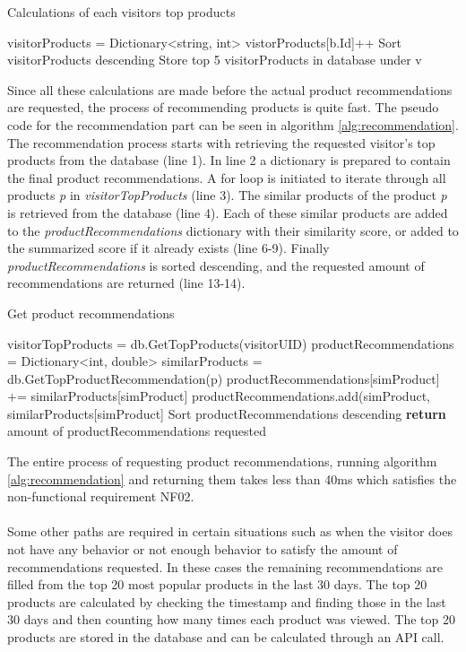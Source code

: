 \begin{algorithm}[H]
\caption{Calculations of each visitors top products}
\label{alg:topProducts}
\begin{algorithmic}[1]
\State visitorProducts = Dictionary<string, int>
\State vistorProducts[b.Id]++
\EndFor
\State Sort visitorProducts descending
\State Store top 5 visitorProducts in database under v
\EndFor
\end{algorithmic}
\end{algorithm}

Since all these calculations are made before the actual product recommendations are requested, the process of recommending products is quite fast. The pseudo code for the recommendation part can be seen in algorithm \ref{alg:recommendation}. The recommendation process starts with retrieving the requested visitor's top products from the database (line 1). In line 2 a dictionary is prepared to contain the final product recommendations. A for loop is initiated to iterate through all products \textit{p} in \textit{visitorTopProducts} (line 3). The similar products of the product \textit{p} is retrieved from the database (line 4). Each of these similar products are added to the \textit{productRecommendations} dictionary with their similarity score, or added to the summarized score if it already exists (line 6-9). Finally \textit{productRecommendations} is sorted descending, and the requested amount of recommendations are returned (line 13-14). 

\begin{algorithm}[H]
\caption{Get product recommendations}
\label{alg:recommendation}
\begin{algorithmic}[1]
\State visitorTopProducts = db.GetTopProducts(visitorUID)
\State productRecommendations = Dictionary<int, double>
\State similarProducts = db.GetTopProductRecommendation(p)
\State productRecommendations[simProduct] += similarProducts[simProduct]
\Else
\State productRecommendations.add(simProduct, similarProducts[simProduct]
\EndIf
\EndFor
\EndFor
\State Sort productRecommendations descending
\State \textbf{return} amount of productRecommendations requested
\State 
\end{algorithmic}
\end{algorithm}

The entire process of requesting product recommendations, running algorithm \ref{alg:recommendation} and returning them takes less than 40ms which satisfies the non-functional requirement NF02. \\\\
Some other paths are required in certain situations such as when the visitor does not have any behavior or not enough behavior to satisfy the amount of recommendations requested. In these cases the remaining recommendations are filled from the top 20 most popular products in the last 30 days. The top 20 products are calculated by checking the timestamp and finding those in the last 30 days and then counting how many times each product was viewed. The top 20 products are stored in the database and can be calculated through an API call.

